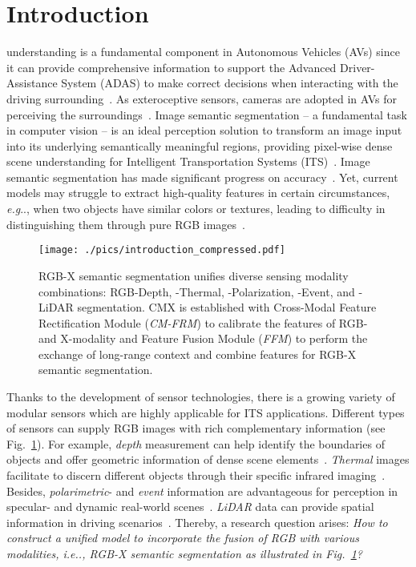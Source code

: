 \documentclass[journal]{IEEEtran}
\makeatletter
\DeclareRobustCommand\onedot{\futurelet\@let@token\@onedot}
\def\@onedot{\ifx\@let@token.\else.\null\fi\xspace}
\def\eg{\emph{e.g}\onedot} \def\Eg{\emph{E.g}\onedot}
\def\ie{\emph{i.e}\onedot} \def\Ie{\emph{I.e}\onedot}
\makeatother
\begin{document}
\section{Introduction}
 understanding is a fundamental component in Autonomous Vehicles (AVs) since it can provide comprehensive information to support the Advanced Driver-Assistance System (ADAS) to make correct decisions when interacting with the driving surrounding~\cite{zhou2019automated}. As exteroceptive sensors, cameras are adopted in AVs for perceiving the surroundings~\cite{yang2020omnisupervised}.
Image semantic segmentation -- a fundamental task in computer vision -- is an ideal perception solution to transform an image input into its underlying semantically meaningful regions, providing pixel-wise dense scene understanding for Intelligent Transportation Systems (ITS)~\cite{sun2020rfnet,zhang2022trans4trans_tits}.
Image semantic segmentation has made significant progress on accuracy~\cite{chen2017deeplab,zhao2017pspnet,fu2019danet}.
Yet, current models may struggle to extract high-quality features in certain circumstances, \eg, when two objects have similar colors or textures, leading to difficulty in distinguishing them through pure RGB images~\cite{hu2019acnet}.

\begin{figure}[t]
\begin{center}
    \texttt{[image: ./pics/introduction\_compressed.pdf]}
\end{center}
    \caption{RGB-X semantic segmentation unifies diverse sensing modality combinations: RGB-Depth, -Thermal, -Polarization, -Event, and -LiDAR segmentation. 
    CMX is established with Cross-Modal Feature Rectification Module (\emph{CM-FRM}) to calibrate the features of RGB- and X-modality and Feature Fusion Module (\emph{FFM}) to perform the exchange of long-range context and combine features for RGB-X semantic segmentation.}
\label{fig:intro}
\end{figure}

Thanks to the development of sensor technologies, there is a growing variety of modular sensors which are highly applicable for ITS applications.
Different types of sensors can supply RGB images with rich complementary information (see Fig.~\ref{fig:intro}).
For example, \emph{depth} measurement can help identify the boundaries of objects and offer geometric information of dense scene elements~\cite{hu2019acnet,chen2020sa_gate}.
\emph{Thermal} images facilitate to discern different objects through their specific infrared imaging~\cite{ha2017mfnet,zhang2021abmdrnet}.
Besides, \emph{polarimetric}- and \emph{event} information are advantageous for perception in specular- and dynamic real-world scenes~\cite{xiang2021polarization,zhang2021issafe}. \emph{LiDAR} data can provide spatial information in driving scenarios~\cite{zhuang2021pmf}. Thereby, a research question arises: {\textit{How to construct a unified model to incorporate the fusion of RGB with various modalities, \ie, RGB-X semantic segmentation as illustrated in Fig.~\ref{fig:intro}?}}
\end{document}
